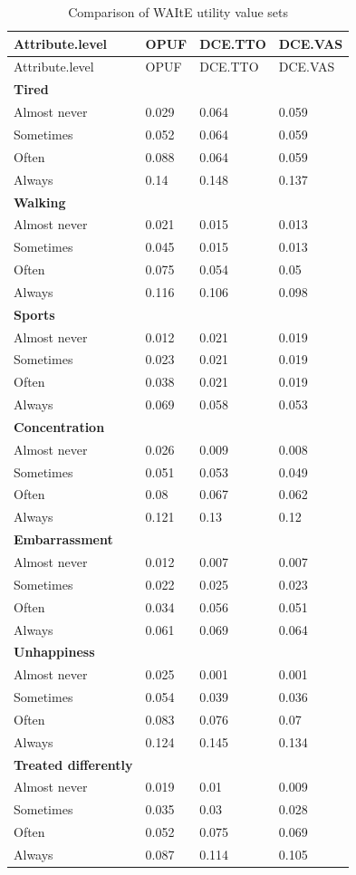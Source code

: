 \documentclass[
  number,
  preprint]{elsarticle}
\begin{document}
\begin{longtable}[]{@{}llll@{}}
\caption{Comparison of WAItE utility value sets}\tabularnewline
\toprule\noalign{}
Attribute.level & OPUF & DCE.TTO & DCE.VAS \\
\midrule\noalign{}
\endfirsthead
\toprule\noalign{}
Attribute.level & OPUF & DCE.TTO & DCE.VAS \\
\midrule\noalign{}
\endhead
\bottomrule\noalign{}
\endlastfoot
\textbf{Tired} & \textbf{} & \textbf{} & \textbf{} \\
Almost never & 0.029 & 0.064 & 0.059 \\
Sometimes & 0.052 & 0.064 & 0.059 \\
Often & 0.088 & 0.064 & 0.059 \\
Always & 0.14 & 0.148 & 0.137 \\
\textbf{Walking} & \textbf{} & \textbf{} & \textbf{} \\
Almost never & 0.021 & 0.015 & 0.013 \\
Sometimes & 0.045 & 0.015 & 0.013 \\
Often & 0.075 & 0.054 & 0.05 \\
Always & 0.116 & 0.106 & 0.098 \\
\textbf{Sports} & \textbf{} & \textbf{} & \textbf{} \\
Almost never & 0.012 & 0.021 & 0.019 \\
Sometimes & 0.023 & 0.021 & 0.019 \\
Often & 0.038 & 0.021 & 0.019 \\
Always & 0.069 & 0.058 & 0.053 \\
\textbf{Concentration} & \textbf{} & \textbf{} & \textbf{} \\
Almost never & 0.026 & 0.009 & 0.008 \\
Sometimes & 0.051 & 0.053 & 0.049 \\
Often & 0.08 & 0.067 & 0.062 \\
Always & 0.121 & 0.13 & 0.12 \\
\textbf{Embarrassment} & \textbf{} & \textbf{} & \textbf{} \\
Almost never & 0.012 & 0.007 & 0.007 \\
Sometimes & 0.022 & 0.025 & 0.023 \\
Often & 0.034 & 0.056 & 0.051 \\
Always & 0.061 & 0.069 & 0.064 \\
\textbf{Unhappiness} & \textbf{} & \textbf{} & \textbf{} \\
Almost never & 0.025 & 0.001 & 0.001 \\
Sometimes & 0.054 & 0.039 & 0.036 \\
Often & 0.083 & 0.076 & 0.07 \\
Always & 0.124 & 0.145 & 0.134 \\
\textbf{Treated differently} & \textbf{} & \textbf{} & \textbf{} \\
Almost never & 0.019 & 0.01 & 0.009 \\
Sometimes & 0.035 & 0.03 & 0.028 \\
Often & 0.052 & 0.075 & 0.069 \\
Always & 0.087 & 0.114 & 0.105 \\
\end{longtable}
\end{document}
